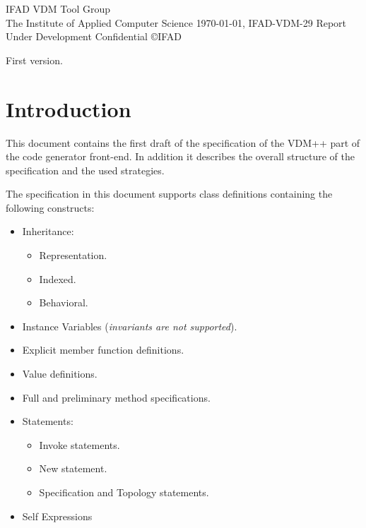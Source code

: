 \documentclass[a4paper,dvips]{article}
\begin{document}

         {IFAD VDM Tool Group \\
          The Institute of Applied Computer Science}
         {\today,}
         {IFAD-VDM-29}
         {Report}
         {Under Development}
         {Confidential}
         {}
         {\copyright IFAD}
         {\item[V1.0] First version.}
         {}


\tableofcontents
\newpage


\section{Introduction}

This document contains the first draft of the specification
of the VDM++ part of the code generator front-end. In addition
it describes the overall structure of the specification and
the used strategies. 

The specification in this document supports class definitions
containing the following constructs:

\begin{itemize}
\item Inheritance:
  \begin{itemize}
  \item Representation.
  \item Indexed.
  \item Behavioral.
  \end{itemize}
\item Instance Variables ({\em invariants are not supported}).
\item Explicit member function definitions.
\item Value definitions.
\item Full and preliminary method specifications.
\item Statements:
  \begin{itemize}
  \item Invoke statements.
  \item New statement.
  \item Specification and Topology statements.
  \end{itemize}
\item Self Expressions
 \end{itemize}
\end{document}
